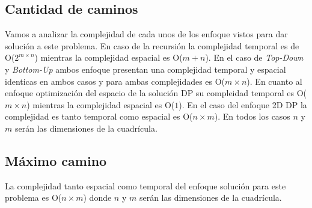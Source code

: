 \subsection{Cantidad de caminos}
Vamos a analizar la complejidad de cada unos de los enfoque vistos para dar solución a este problema. En caso de la recursión la complejidad temporal es de O($2^{m \times n}$) mientras la complejidad espacial es O($m+n$). En el caso de \emph{Top-Down} y \emph{Bottom-Up} ambos enfoque presentan una complejidad temporal y espacial identicas en ambos casos y para ambas complejidades es O($m \times n$). En cuanto al enfoque optimización del espacio de la solución DP su compleidad temporal es O($m \times n$) mientras la complejidad espacial es O($1$). En el caso del enfoque 2D DP la complejidad es tanto temporal como espacial es O($n\times m$). En todos los casos $n$ y $m$ serán las dimensiones de la cuadrícula.

\subsection{Máximo camino}

La complejidad tanto espacial como temporal del enfoque solución para este problema es O($n\times m$) donde $n$ y $m$ serán las dimensiones de la cuadrícula. 

